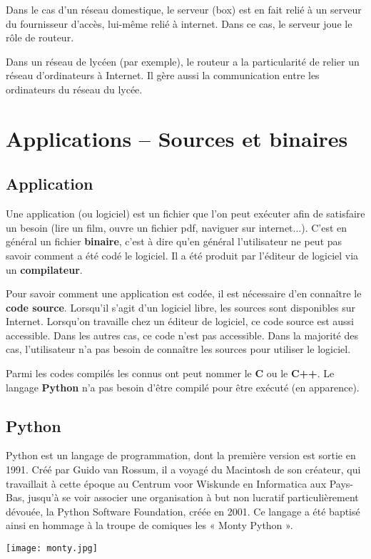 Dans le cas d’un réseau domestique, le serveur (box) est en fait relié à un serveur du fournisseur d’accès, lui-même relié à internet. Dans ce cas, le serveur joue le rôle de routeur. 

Dans un réseau de lycéen (par exemple), le routeur a la particularité de relier un réseau d’ordinateurs à Internet. Il gère aussi la communication entre les ordinateurs du réseau du lycée.

\section{Applications -- Sources et binaires}
\subsection{Application}
Une application (ou logiciel) est un fichier que l'on peut exécuter afin de satisfaire un besoin (lire un film, ouvre un fichier pdf, naviguer sur internet...). C'est en général un fichier \textbf{binaire}, c'est à dire qu'en général l'utilisateur ne peut pas savoir comment a été codé le logiciel. Il a été produit par l'éditeur de logiciel via un \textbf{compilateur}.

Pour savoir comment une application est codée, il est nécessaire d'en connaître le \textbf{code source}.  Lorsqu'il s'agit d'un logiciel libre, les sources sont disponibles sur Internet. Lorsqu'on travaille chez un éditeur de logiciel, ce code source est aussi accessible. Dans les autres cas, ce code n'est pas accessible. Dans la majorité des cas, l'utilisateur n'a pas besoin de connaître les sources pour utiliser le logiciel. 

Parmi les codes compilés les connus ont peut nommer le \textbf{C} ou le \textbf{C++}. Le langage \textbf{Python} n'a pas besoin d'être compilé pour être exécuté (en apparence). 




\subsection{Python}
\begin{minipage}[c]{.79\linewidth}

Python est un langage de programmation, dont la première version est sortie en 1991. Créé par Guido van Rossum, il a voyagé du Macintosh de son créateur, qui travaillait à cette époque au Centrum voor Wiskunde en Informatica aux Pays-Bas, jusqu'à se voir associer une organisation à but non lucratif particulièrement dévouée, la Python Software Foundation, créée en 2001. Ce langage a été baptisé ainsi en hommage à la troupe de comiques les « Monty Python ».
\end{minipage} \hfill
\begin{minipage}[c]{.2\linewidth}
\begin{center}
\texttt{[image: monty.jpg]}
\end{center}
\end{minipage}

